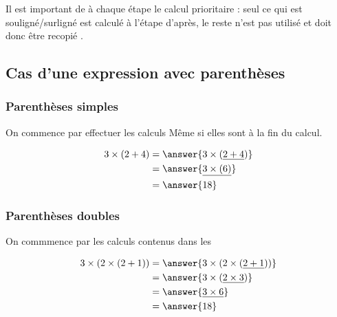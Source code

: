 \begin{aretenir}
    Il est important de  à chaque étape le 
    calcul prioritaire : seul ce qui est souligné/surligné est calculé à
    l'étape d’après, le reste n'est pas utilisé et doit donc être recopié
    .
\end{aretenir}

\subsection{Cas d'une expression avec parenthèses}
\subsubsection{Parenthèses simples}

\begin{convention}
    On commence par effectuer les calculs  
    Même si elles sont à la fin du calcul.
\end{convention}

\begin{exemplebox}
    \begin{align*}
        3 \times (2 + 4) &= \answer{3 \times (\underline{2+4})}\\
        &= \answer{\underline{3 \times (6)}}\\
        &= \answer{18}
    \end{align*}
\end{exemplebox}
\subsubsection{Parenthèses doubles}
\begin{convention}
    On commmence par les calculs contenus dans les
\end{convention}
\begin{exemplebox}
    \begin{align*}
        3 \times (2 \times (2+1)) &= \answer{3 \times (2 \times (\underline{2+1}))}\\
        &= \answer{3 \times (\underline{2\times3})}\\
        &= \answer{\underline{3\times6}}\\
        &= \answer{18}
    \end{align*}
\end{exemplebox}

